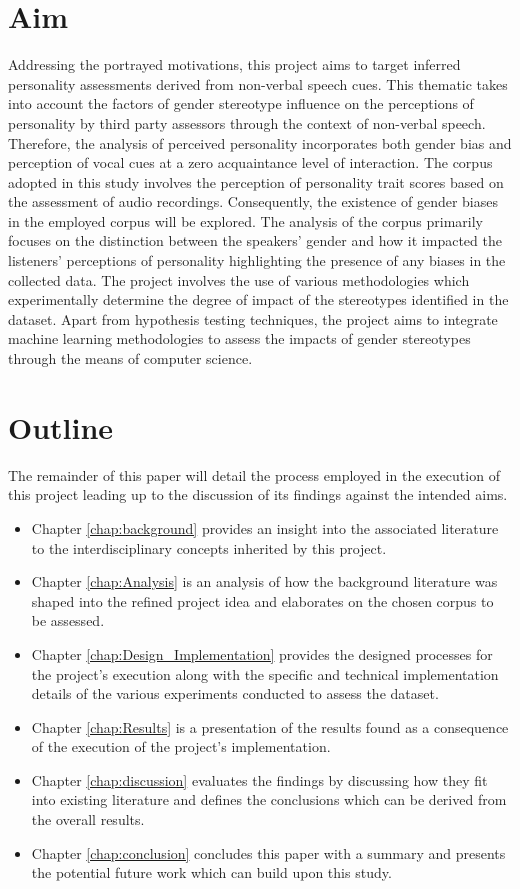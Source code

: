 \documentclass{l4proj}
\begin{document}
\section{Aim}
Addressing the portrayed motivations, this project aims to target inferred personality assessments derived from non-verbal speech cues. This thematic takes into account the factors of gender stereotype influence on the perceptions of personality by third party assessors through the context of non-verbal speech. Therefore, the analysis of perceived personality incorporates both gender bias and perception of vocal cues at a zero acquaintance level of interaction.
The corpus adopted in this study involves the perception of personality trait scores based on the assessment of audio recordings. Consequently, the existence of gender biases in the employed corpus will be explored. The analysis of the corpus primarily focuses on the distinction between the speakers’ gender and how it impacted the listeners’ perceptions of personality highlighting the presence of any biases in the collected data. The project involves the use of various methodologies which experimentally determine the degree of impact of the stereotypes identified in the dataset. Apart from hypothesis testing techniques, the project aims to integrate machine learning methodologies to assess the impacts of gender stereotypes through the means of computer science. 

\section{Outline}
The remainder of this paper will detail the process employed in the execution of this project leading up to the discussion of its findings against the intended aims.
\begin{itemize}
    \item Chapter \ref{chap:background} provides an insight into the associated literature to the interdisciplinary concepts inherited by this project.
    \item Chapter \ref{chap:Analysis} is an analysis of how the background literature was shaped into the refined project idea and elaborates on the chosen corpus to be assessed.
    \item Chapter \ref{chap:Design_Implementation} provides the designed processes for the project’s execution along with the specific and technical implementation details of the various experiments conducted to assess the dataset.
    \item Chapter \ref{chap:Results} is a presentation of the results found as a consequence of the execution of the project’s implementation.
    \item Chapter \ref{chap:discussion} evaluates the findings by discussing how they fit into existing literature and defines the conclusions which can be derived from the overall results.
    \item Chapter \ref{chap:conclusion} concludes this paper with a summary and presents the potential future work which can build upon this study.
    
\end{itemize}
\end{document}
